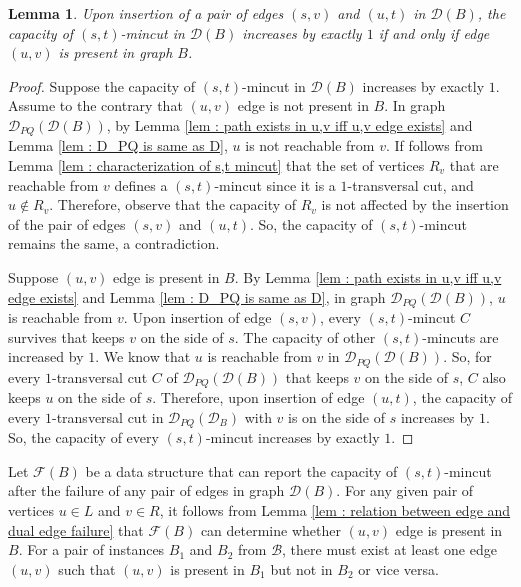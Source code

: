 \documentclass[letterpaper,11pt]{article}
\newtheorem{lemma}{Lemma}[]
\begin{document}
\begin{lemma} \label{lem : relation between edge and dual edge insertion}
    Upon insertion of a pair of edges $(s,v)$ and $(u,t)$ in ${\mathcal D}(B)$, the capacity of $(s,t)$-mincut in ${\mathcal D}(B)$ increases by exactly $1$ if and only if edge $(u,v)$ is present in graph $B$. 
\end{lemma}
\begin{proof}
    Suppose the capacity of $(s,t)$-mincut in ${\mathcal D}(B)$ increases by exactly $1$. Assume to the contrary that $(u,v)$ edge is not present in $B$. In graph ${\mathcal D}_{PQ}({\mathcal D}(B))$, by Lemma \ref{lem : path exists in u,v iff u,v edge exists} and Lemma \ref{lem : D_PQ is same as D}, $u$ is not reachable from $v$. If follows from Lemma \ref{lem : characterization of s,t mincut} that the set of vertices $R_v$ that are reachable from $v$ defines a $(s,t)$-mincut since it is a $1$-transversal cut, and $u\notin R_v$. Therefore, observe that the capacity of $R_v$ is not affected by the insertion of the pair of edges $(s,v)$ and $(u,t)$. So, the capacity of $(s,t)$-mincut remains the same, a contradiction.

    Suppose $(u,v)$ edge is present in $B$. By Lemma \ref{lem : path exists in u,v iff u,v edge exists} and Lemma \ref{lem : D_PQ is same as D}, in graph ${\mathcal D}_{PQ}({\mathcal D}(B))$, $u$ is reachable from $v$. Upon insertion of edge $(s,v)$, every $(s,t)$-mincut $C$ survives that keeps $v$ on the side of $s$. The capacity of other $(s,t)$-mincuts are increased by $1$. We know that $u$ is reachable from $v$ in ${\mathcal D}_{PQ}({\mathcal D}(B))$. So, for every $1$-transversal cut $C$ of ${\mathcal D}_{PQ}({\mathcal D}(B))$ that keeps $v$ on the side of $s$, $C$ also keeps $u$ on the side of $s$. Therefore, upon insertion of edge $(u,t)$, the capacity of every $1$-transversal cut in ${\mathcal D}_{PQ}({\mathcal D}_B)$ with $v$ is on the side of $s$ increases by $1$. So, the capacity of every $(s,t)$-mincut increases by exactly $1$.  
\end{proof}
Let ${\mathcal F}(B)$ be a data structure that can report the capacity of $(s,t)$-mincut after the failure of any pair of edges in graph ${\mathcal D}(B)$. For any given pair of vertices $u\in L$ and $v\in R$, it follows from Lemma \ref{lem : relation between edge and dual edge failure} that ${\mathcal F}(B)$ can determine whether $(u,v)$ edge is present in $B$. For a pair of instances $B_1$ and $B_2$ from ${\mathcal B}$, there must exist at least one edge $(u,v)$ such that $(u,v)$ is present in $B_1$ but not in $B_2$ or vice versa.  
\end{document}
